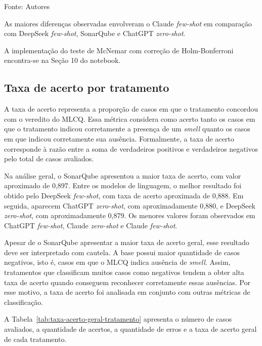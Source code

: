 \begin{table}[H]
Fonte: Autores
\end{table}

As maiores diferenças observadas envolveram o Claude \textit{few-shot} em comparação com DeepSeek \textit{few-shot}, SonarQube e ChatGPT \textit{zero-shot}.

A implementação do teste de McNemar com correção de Holm-Bonferroni encontra-se na Seção 10 do notebook.

\subsection{Taxa de acerto por tratamento}

A taxa de acerto representa a proporção de casos em que o tratamento concordou com o veredito do MLCQ. Essa métrica considera como acerto 
tanto os casos em que o tratamento indicou corretamente a presença de um \textit{smell} quanto os casos em que indicou corretamente sua ausência. 
Formalmente, a taxa de acerto corresponde à razão entre a soma de verdadeiros positivos e verdadeiros negativos pelo total de casos avaliados.

Na análise geral, o SonarQube apresentou a maior taxa de acerto, com valor aproximado de 0,897. Entre os modelos de linguagem, o melhor resultado 
foi obtido pelo DeepSeek \textit{few-shot}, com taxa de acerto aproximada de 0,888. Em seguida, aparecem ChatGPT \textit{zero-shot}, com aproximadamente 0,880, 
e DeepSeek \textit{zero-shot}, com aproximadamente 0,879. Os menores valores foram observados em ChatGPT \textit{few-shot}, Claude \textit{zero-shot} e Claude \textit{few-shot}.

Apesar de o SonarQube apresentar a maior taxa de acerto geral, esse resultado deve ser interpretado com cautela. A base possui maior quantidade de casos negativos, 
isto é, casos em que o MLCQ indica ausência de \textit{smell}. Assim, tratamentos que classificam muitos casos como negativos tendem a obter alta taxa de acerto 
quando conseguem reconhecer corretamente essas ausências. Por esse motivo, a taxa de acerto foi analisada em conjunto com outras métricas de classificação.

A Tabela~\ref{tab:taxa-acerto-geral-tratamento} apresenta o número de casos avaliados, a quantidade de acertos, a quantidade de erros e a taxa de acerto geral de cada tratamento.

